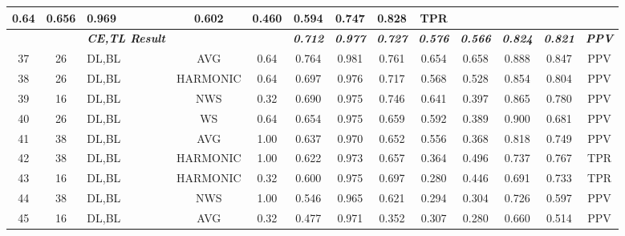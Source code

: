 \begin{table}[H]
{\begin{tabular}{cc|l|cc|c|c|c|c|c|c|c|c|}
    0.64 &
    0.656 &
    0.969 &
    0.602 &
    0.460 &
    0.594 &
    0.747 &
    0.828 &
    TPR \\ \hline
   &
    \textit{\textbf{}} &
    \textit{\textbf{CE,TL Result}} &
     &
     &
    \textit{\textbf{0.712}} &
    \textit{\textbf{0.977}} &
    \textit{\textbf{0.727}} &
    \textit{\textbf{0.576}} &
    \textit{\textbf{0.566}} &
    \textit{\textbf{0.824}} &
    \textit{\textbf{0.821}} &
    \textit{\textbf{PPV}} \\ \hline
  \multicolumn{1}{|c|}{37} &
    26 &
    DL,BL &
    \multicolumn{1}{c|}{AVG} &
    0.64 &
    0.764 &
    0.981 &
    0.761 &
    0.654 &
    0.658 &
    0.888 &
    0.847 &
    PPV \\ \hline
  \multicolumn{1}{|c|}{38} &
    26 &
    DL,BL &
    \multicolumn{1}{c|}{HARMONIC} &
    0.64 &
    0.697 &
    0.976 &
    0.717 &
    0.568 &
    0.528 &
    0.854 &
    0.804 &
    PPV \\ \hline
  \multicolumn{1}{|c|}{39} &
    16 &
    DL,BL &
    \multicolumn{1}{c|}{NWS} &
    0.32 &
    0.690 &
    0.975 &
    0.746 &
    0.641 &
    0.397 &
    0.865 &
    0.780 &
    PPV \\ \hline
  \multicolumn{1}{|c|}{40} &
    26 &
    DL,BL &
    \multicolumn{1}{c|}{WS} &
    0.64 &
    0.654 &
    0.975 &
    0.659 &
    0.592 &
    0.389 &
    0.900 &
    0.681 &
    PPV \\ \hline
  \multicolumn{1}{|c|}{41} &
    38 &
    DL,BL &
    \multicolumn{1}{c|}{AVG} &
    1.00 &
    0.637 &
    0.970 &
    0.652 &
    0.556 &
    0.368 &
    0.818 &
    0.749 &
    PPV \\ \hline
  \multicolumn{1}{|c|}{42} &
    38 &
    DL,BL &
    \multicolumn{1}{c|}{HARMONIC} &
    1.00 &
    0.622 &
    0.973 &
    0.657 &
    0.364 &
    0.496 &
    0.737 &
    0.767 &
    TPR \\ \hline
  \multicolumn{1}{|c|}{43} &
    16 &
    DL,BL &
    \multicolumn{1}{c|}{HARMONIC} &
    0.32 &
    0.600 &
    0.975 &
    0.697 &
    0.280 &
    0.446 &
    0.691 &
    0.733 &
    TPR \\ \hline
  \multicolumn{1}{|c|}{44} &
    38 &
    DL,BL &
    \multicolumn{1}{c|}{NWS} &
    1.00 &
    0.546 &
    0.965 &
    0.621 &
    0.294 &
    0.304 &
    0.726 &
    0.597 &
    PPV \\ \hline
  \multicolumn{1}{|c|}{45} &
    16 &
    DL,BL &
    \multicolumn{1}{c|}{AVG} &
    0.32 &
    0.477 &
    0.971 &
    0.352 &
    0.307 &
    0.280 &
    0.660 &
    0.514 &
    PPV \\ \hline

\end{tabular}}
\end{table}
